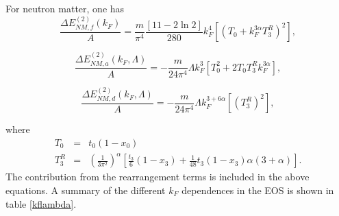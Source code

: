 \documentclass[aps,11pt,prc,preprint,superscriptaddress,nofootinbib]{revtex4}
\begin{document}
For neutron matter, one has%
\begin{equation}
\frac{\Delta E_{NM,f}^{(2)}(k_{F})}{A}=\frac{m}{\pi ^{4}}\frac{\left[11-2\ln 2\right]}{280%
}k_{F}^{4}\left[ (T_{0}+k_{F}^{3\alpha }T_{3}^{R})^{2}\right] ,  \label{n1}
\end{equation}

\begin{equation}
\frac{\Delta E_{NM,a}^{(2)}(k_{F},\Lambda )}{A}=-\frac{m}{24\pi ^{4}}\Lambda
k_{F}^{3}\left[ T_{0}^{2}+2T_{0}T_{3}^{R}k_{F}^{3\alpha }\right] ,
\label{n2}
\end{equation}

\begin{equation}
\frac{\Delta E_{NM,d}^{(2)}(k_{F},\Lambda )}{A}=-\frac{m}{24\pi ^{4}}\Lambda
k_{F}^{3+6\alpha }\left[ (T_{3}^{R})^{2}\right] ,  \label{n3}
\end{equation}

\bigskip where%
\begin{eqnarray}
T_{0} &=&t_{0}(1-x_{0}) \\
T_{3}^{R} &=&\left(\frac{1}{3\pi ^{2}}\right)^{\alpha }\left[ \frac{t_{3}}{6}(1-x_{3})+%
\frac{1}{48}t_{3}(1-x_{3})\alpha (3+\alpha )\right] .
\end{eqnarray}%
The contribution from the rearrangement terms \cite{car,pastore} is included in the above
equations. A summary of the different $k_F$ dependences in the EOS is shown in table \ref{kflambda}.
\end{document}

